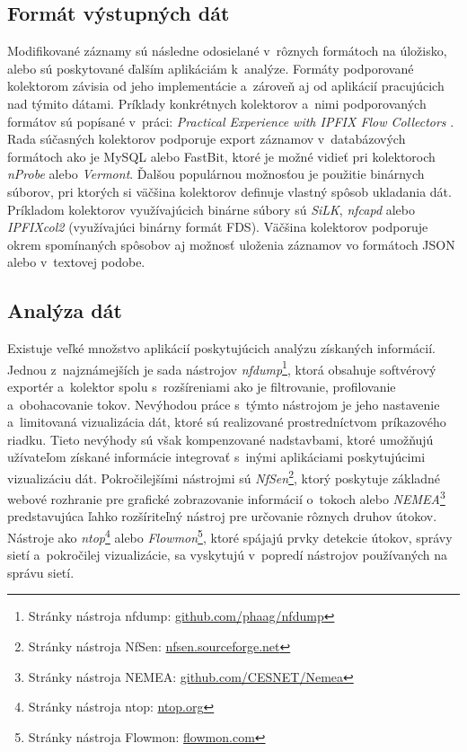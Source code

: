 \subsection*{Formát výstupných dát}

Modifikované záznamy sú následne odosielané v~rôznych formátoch na úložisko, alebo sú poskytované ďalším aplikáciám k~analýze. Formáty podporované kolektorom závisia od jeho implementácie a~zároveň aj od aplikácií pracujúcich nad týmito dátami. Príklady konkrétnych kolektorov
a~nimi podporovaných formátov sú popísané v~práci: \textit{Practical Experience with IPFIX Flow Collectors} \cite{velan_kolektory}. Rada súčasných kolektorov podporuje export záznamov v~databázových formátoch ako je MySQL alebo FastBit, ktoré je možné vidieť pri kolektoroch
\textit{nProbe} alebo \textit{Vermont}. Ďalšou populárnou možnosťou je použitie binárnych súborov, pri ktorých si väčšina kolektorov definuje vlastný spôsob ukladania dát. Príkladom kolektorov využívajúcich binárne súbory sú \textit{SiLK}, \textit{nfcapd} alebo \textit{IPFIXcol2}
(využívajúci binárny formát FDS). Väčšina kolektorov podporuje okrem spomínaných spôsobov aj možnosť uloženia záznamov vo formátoch JSON alebo v~textovej podobe.

\subsection*{Analýza dát}

Existuje veľké množstvo aplikácií poskytujúcich analýzu získaných informácií. Jednou z~najznámejších je sada nástrojov \textit{nfdump}\footnote{Stránky nástroja nfdump: \href{https://github.com/phaag/nfdump}{github.com/phaag/nfdump}}, ktorá obsahuje softvérový
exportér a~kolektor spolu s~rozšíreniami ako je filtrovanie, profilovanie a~obohacovanie tokov. Nevýhodou práce s~týmto nástrojom je jeho nastavenie a~limitovaná vizualizácia dát, ktoré sú realizované prostredníctvom príkazového riadku. Tieto nevýhody sú však kompenzované
nadstavbami, ktoré umožňujú užívateľom získané informácie integrovať s~inými aplikáciami poskytujúcimi vizualizáciu dát.
Pokročilejšími nástrojmi sú \textit{NfSen}\footnote{Stránky nástroja NfSen: \href{https://nfsen.sourceforge.net}{nfsen.sourceforge.net}}, ktorý poskytuje
základné webové rozhranie pre grafické zobrazovanie informácií o~tokoch alebo \textit{NEMEA}\footnote{Stránky nástroja NEMEA: \href{https://github.com/CESNET/Nemea}{github.com/CESNET/Nemea}} predstavujúca ľahko rozšíriteľný nástroj pre určovanie rôznych druhov útokov.
Nástroje ako \textit{ntop}\footnote{Stránky nástroja ntop: \href{https://www.ntop.org}{ntop.org}} alebo \textit{Flowmon}\footnote{Stránky nástroja Flowmon: \href{https://www.flowmon.com}{flowmon.com}}, ktoré spájajú prvky detekcie útokov, správy sietí a~pokročilej vizualizácie,
sa vyskytujú v~popredí nástrojov používaných na správu sietí.

